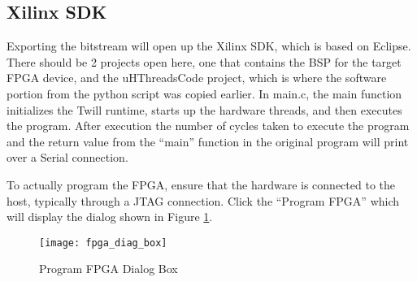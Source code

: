 \subsection{Xilinx SDK}
Exporting the bitstream will open up the Xilinx SDK, which is based on Eclipse. There should be 2 projects open here, one that contains the BSP for the target FPGA device, and the uHThreadsCode project, which is where the software portion from the python script was copied earlier. In main.c, the main function initializes the Twill runtime, starts up the hardware threads, and then executes the program. After execution the number of cycles taken to execute the program and the return value from the ``main'' function in the original program will print over a Serial connection.

To actually program the FPGA, ensure that the hardware is connected to the host, typically through a JTAG connection. Click the ``Program FPGA'' which will display the dialog shown in Figure \ref{fig:fpga_diag_box}.

\begin{figure}
	\centering
		\texttt{[image: fpga\_diag\_box]}
	\caption{Program FPGA Dialog Box\label{fig:fpga_diag_box}}
\end{figure}